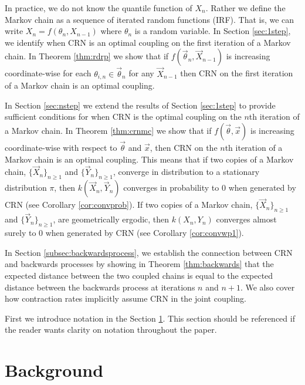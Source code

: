 \documentclass[12pt]{article}
\theoremstyle{plain}%
\theoremstyle{definition}
\begin{document}
In practice, we do not know the quantile function of $X_n$. Rather we define the Markov chain as a sequence of iterated random functions (IRF). That is, we can write $X_n=f(\theta_n,X_{n-1})$ where $\theta_n$ is a random variable. 
In Section \ref{sec:1step}, we identify when CRN is an optimal coupling on the first iteration of a Markov chain. In Theorem \ref{thm:rdrp} we show that if $f(\vec{\theta}_n,\vec{X}_{n-1})$ is increasing coordinate-wise for each $\theta_{i,n}\in \vec{\theta}_{n}$ for any $\vec{X}_{n-1}$ then CRN on the first iteration of a Markov chain is an optimal coupling.

In Section \ref{sec:nstep} we extend the results of Section \ref{sec:1step} to provide sufficient conditions for when CRN is the optimal coupling on the $n$th iteration of a Markov chain. In Theorem \ref{thm:crnmc} we show that if $f(\vec{\theta},\vec{x})$ is increasing coordinate-wise with respect to $ \vec{\theta}$ and $\vec{x}$, then CRN on the $n$th iteration of a Markov chain is an optimal coupling. This means that if two copies of a Markov chain, $\{\vec{X}_n\}_{n\geq1}$ and $\{\vec{Y}_n\}_{n\geq1}$, converge in distribution to a stationary distribution $\pi$, then $k(\vec{X}_n,\vec{Y}_n)$ converges in probability to 0 when generated by CRN (see Corollary \ref{cor:convprob}). If two copies of a Markov chain, $\{\vec{X}_n\}_{n\geq1}$ and $\{\vec{Y}_n\}_{n\geq1}$, are geometrically ergodic, then $k(X_n,Y_n)$ converges almost surely to 0 when generated by CRN (see Corollary \ref{cor:convwp1}).

In Section \ref{subsec:backwardsprocess}, we establish the connection between CRN and backwards processes by showing in Theorem \ref{thm:backwards} that the expected distance between the two coupled chains is equal to the expected distance between the backwards process at iterations $n$ and $n+1$. We also cover how contraction rates implicitly assume CRN in the joint coupling. 

First we introduce notation in the Section \ref{sec:background}. This section should be referenced if the reader wants clarity on notation throughout the paper.
		
\section{Background}\label{sec:background}
\end{document}
